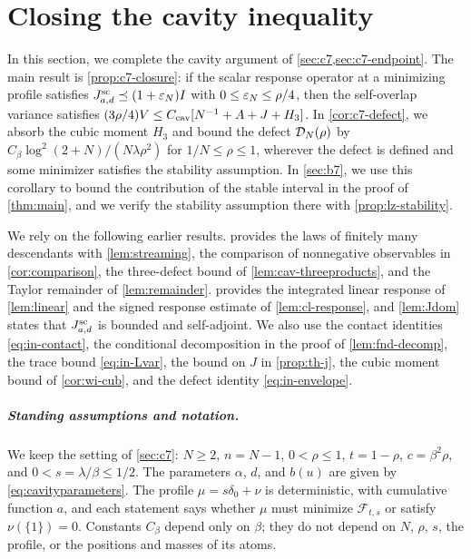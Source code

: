 \chapter{Closing the cavity inequality}\label{sec:c7-closure}

In this section, we complete the cavity argument of
\cref{sec:c7,sec:c7-endpoint}. The main result is
\cref{prop:c7-closure}: if the scalar response operator at a minimizing
profile satisfies $J^{\mathrm{sc}}_{a,d}\preceq(1+\varepsilon_N)I$ with
$0\le\varepsilon_N\le\rho/4$, then the self-overlap variance satisfies
$(3\rho/4)V\le C_{\rm cav}[N^{-1}+A+J+H_3]$. In \cref{cor:c7-defect},
we absorb the cubic moment $H_3$ and bound the defect $\mathcal D_N(\rho)$ by
$C_\beta\log^2(2+N)/(N\lambda\rho^2)$ for $1/N\le\rho\le1$, wherever
the defect is defined and some minimizer satisfies the stability
assumption. In \cref{sec:b7}, we use this corollary to bound the contribution of
the stable interval in the proof of \cref{thm:main}, and we verify the
stability assumption there with \cref{prop:lz-stability}.

We rely on the following earlier results. 
provides the laws of finitely many descendants with
\cref{lem:streaming}, the comparison of nonnegative observables in
\cref{cor:comparison}, the three-defect bound of
\cref{lem:cav-threeproducts}, and the Taylor remainder of
\cref{lem:remainder}.  provides the integrated
linear response of \cref{lem:linear} and the signed response estimate
of \cref{lem:cl-response}, and \cref{lem:Jdom} states that
$J^{\mathrm{sc}}_{a,d}$ is bounded and self-adjoint. We also use the contact
identities
\eqref{eq:in-contact}, the conditional decomposition in the proof of
\cref{lem:fnd-decomp}, the trace bound \eqref{eq:in-Lvar}, the bound on
$J$ in \cref{prop:th-j}, the cubic moment bound of \cref{cor:wi-cub},
and the defect identity \eqref{eq:in-envelope}.

\paragraph{Standing assumptions and notation.} We keep the setting of
\cref{sec:c7}: $N\ge2$, $n=N-1$, $0<\rho\le1$, $t=1-\rho$,
$c=\beta^2\rho$, and $0<s=\lambda/\beta\le1/2$. The parameters $\alpha$, $d$, and
$b(u)$ are given by \eqref{eq:cavityparameters}. The profile
$\mu=s\delta_0+\nu$ is deterministic, with cumulative function $a$, and
each statement says whether $\mu$ must minimize $\mathcal F_{t,s}$ or
satisfy $\nu(\{1\})=0$. Constants $C_\beta$ depend only on $\beta$; they
do not depend on $N$, $\rho$, $s$, the profile, or the positions and
masses of its atoms.

